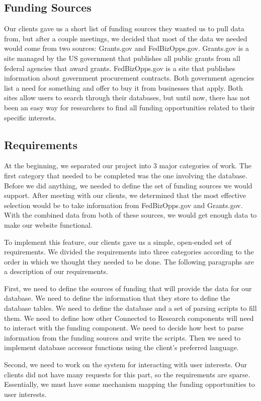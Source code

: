 \documentclass[onecolumn]{IEEEtran}
\begin{document}
\subsection{Funding Sources}
Our clients gave us a short list of funding sources they wanted us to pull data from, but after a couple meetings, we decided that most of the data we needed would come from two sources: Grants.gov and FedBizOpps.gov. Grants.gov is a site managed by the US government that publishes all public grants from all federal agencies that award grants. FedBizOpps.gov is a site that publishes information about government procurement contracts. Both government agencies list a need for something and offer to buy it from businesses that apply. Both sites allow users to search through their databases, but until now, there has not been an easy way for researchers to find all funding opportunities related to their specific interests. 

\subsection{Requirements}
At the beginning, we separated our project into 3 major categories of work. The first category that needed to be completed was the one involving the database. Before we did anything, we needed to define the set of funding sources we would support. After meeting with our clients, we determined that the most effective selection would be to take information from FedBizOpps.gov and Grants.gov. With the combined data from both of these sources, we would get enough data to make our website functional. 

To implement this feature, our clients gave us a simple, open-ended set of requirements. We divided the requirements into three categories according to the order in which we thought they needed to be done. The following paragraphs are a description of our requirements. 

First, we need to define the sources of funding that will provide the data for our database. We need to define the information that they store to define the database tables. We need to define the database and a set of parsing scripts to fill them. We need to define how other Connected to Research components will need to interact with the funding component. We need to decide how best to parse information from the funding sources and write the scripts. Then we need to implement database accessor functions using the client's preferred language. 

Second, we need to work on the system for interacting with user interests. Our clients did not have many requests for this part, so the requirements are sparse. Essentially, we must have some mechanism mapping the funding opportunities to user interests. 
\end{document}
